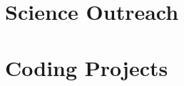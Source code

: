 \documentclass{cv}
\begin{document}
    \vspace*{0.25cm}

    \section{Science Outreach}
        

    \vspace*{0.25cm}

    \section{Coding Projects}
        
        \vspace*{0.1cm}
        
\end{document}
